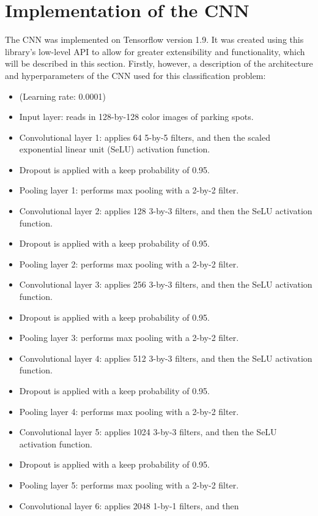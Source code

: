 \documentclass[a4paper, 11pt]{article} %
\begin{document}
\section{Implementation of the CNN}
	The CNN was implemented on Tensorflow version 1.9. It was created using this library's low-level API to
	allow for greater extensibility and functionality, which will be described in this section. Firstly, however,
	a description of the architecture and hyperparameters of the CNN used for this classification problem:
	\begin{itemize}
		\item[] (Learning rate: 0.0001)
		\item[] Input layer: reads in 128-by-128 color images of parking spots.
		\item[] Convolutional layer 1: applies 64 5-by-5 filters, and then the 
		scaled exponential linear unit (SeLU) activation function.
		\item[] Dropout is applied with a keep probability of 0.95.
		\item[] Pooling layer 1: performs max pooling with a 2-by-2 filter.
		\item[] Convolutional layer 2: applies 128 3-by-3 filters, and then the 
		SeLU activation function.
		\item[] Dropout is applied with a keep probability of 0.95.
		\item[] Pooling layer 2: performs max pooling with a 2-by-2 filter.
		\item[] Convolutional layer 3: applies 256 3-by-3 filters, and then the 
		SeLU activation function.
		\item[] Dropout is applied with a keep probability of 0.95.
		\item[] Pooling layer 3: performs max pooling with a 2-by-2 filter.
		\item[] Convolutional layer 4: applies 512 3-by-3 filters, and then the 
		SeLU activation function.
		\item[] Dropout is applied with a keep probability of 0.95.
		\item[] Pooling layer 4: performs max pooling with a 2-by-2 filter.
		\item[] Convolutional layer 5: applies 1024 3-by-3 filters, and then 
		the SeLU activation function.
		\item[] Dropout is applied with a keep probability of 0.95.
		\item[] Pooling layer 5: performs max pooling with a 2-by-2 filter.
		\item[] Convolutional layer 6: applies 2048 1-by-1 filters, and then 

\end{itemize}
\end{document}
